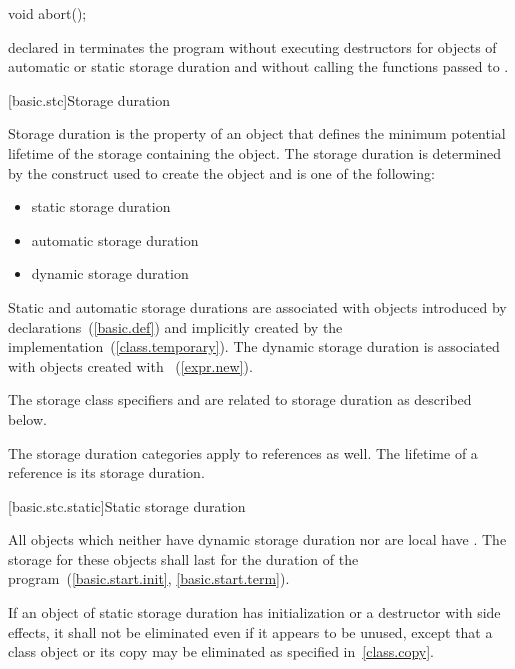 \begin{codeblock}
void abort();
\end{codeblock}

declared in
%
 terminates the program without executing destructors
for objects of automatic or static storage duration and without calling
the functions passed to .%

[basic.stc]{Storage duration}

\pnum
{}%
Storage duration is the property of an object that defines the minimum
potential lifetime of the storage containing the object. The storage
duration is determined by the construct used to create the object and is
one of the following:

\begin{itemize}
\item static storage duration
\item automatic storage duration
\item dynamic storage duration
\end{itemize}

\pnum
{}%
%
%
Static and automatic storage durations are associated with objects
introduced by declarations~(\ref{basic.def}) and implicitly created by
the implementation~(\ref{class.temporary}). The dynamic storage duration
is associated with objects created with 
~(\ref{expr.new}).

\pnum
The storage class specifiers  and  are related
to storage duration as described below.

\pnum
The storage duration categories apply to references as well. The
lifetime of a reference is its storage duration.

[basic.stc.static]{Static storage duration}

\pnum
{}%
All objects which neither have dynamic storage duration nor are local
have . The
storage for these objects shall last for the duration of the
program~(\ref{basic.start.init}, \ref{basic.start.term}).

\pnum
If an object of static storage duration has initialization or a
destructor with side effects, it shall not be eliminated even if it
appears to be unused, except that a class object or its copy may be
eliminated as specified in~\ref{class.copy}.


